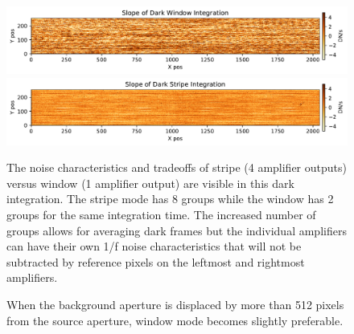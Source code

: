 \documentclass{aastex62}
\begin{document}
\begin{figure}[!hbtp]
\centering
\includegraphics[width=0.7\columnwidth]{darkwindow_img.pdf}
\includegraphics[width=.7\columnwidth]{darkstripe_img.pdf}
\caption{The noise characteristics and tradeoffs of stripe (4 amplifier outputs) versus window (1 amplifier output) are visible in this dark integration.
The stripe mode has 8 groups while the window has 2 groups for the same integration time.
The increased number of groups allows for averaging dark frames but the individual amplifiers can have their own 1/f noise characteristics that will not be subtracted by reference pixels on the leftmost and rightmost amplifiers.}\label{fig:darkWindowVsDarkStripe}
\end{figure}


\begin{figure}
{}
\caption{When the background aperture is displaced by more than 512 pixels from the source aperture, window mode becomes slightly preferable.
}\label{fig:stripeVsWindowAZlab04LargerBacksep}
\end{figure}


\clearpage
\end{document}
